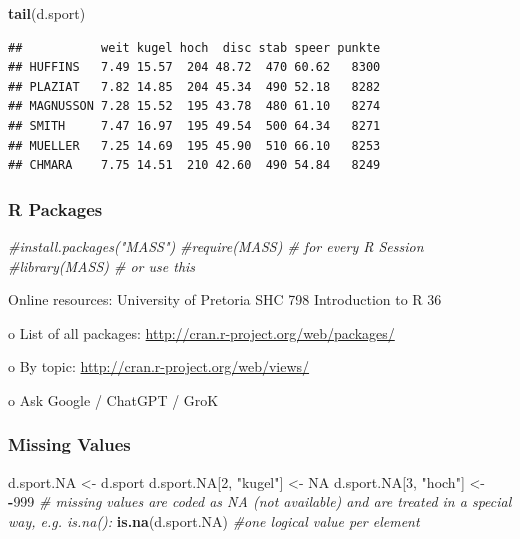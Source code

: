 \documentclass[
]{article}
\newenvironment{Shaded}{\begin{snugshade}}{\end{snugshade}}
\newcommand{\CommentTok}[1]{\textcolor[rgb]{0.56,0.35,0.01}{\textit{#1}}}
\newcommand{\ConstantTok}[1]{\textcolor[rgb]{0.56,0.35,0.01}{#1}}
\newcommand{\DecValTok}[1]{\textcolor[rgb]{0.00,0.00,0.81}{#1}}
\newcommand{\FunctionTok}[1]{\textcolor[rgb]{0.13,0.29,0.53}{\textbf{#1}}}
\newcommand{\NormalTok}[1]{#1}
\newcommand{\OtherTok}[1]{\textcolor[rgb]{0.56,0.35,0.01}{#1}}
\newcommand{\SpecialCharTok}[1]{\textcolor[rgb]{0.81,0.36,0.00}{\textbf{#1}}}
\newcommand{\StringTok}[1]{\textcolor[rgb]{0.31,0.60,0.02}{#1}}
\begin{document}
\begin{Shaded}
\begin{Highlighting}[]
\FunctionTok{tail}\NormalTok{(d.sport)}
\end{Highlighting}
\end{Shaded}

\begin{verbatim}
##           weit kugel hoch  disc stab speer punkte
## HUFFINS   7.49 15.57  204 48.72  470 60.62   8300
## PLAZIAT   7.82 14.85  204 45.34  490 52.18   8282
## MAGNUSSON 7.28 15.52  195 43.78  480 61.10   8274
## SMITH     7.47 16.97  195 49.54  500 64.34   8271
## MUELLER   7.25 14.69  195 45.90  510 66.10   8253
## CHMARA    7.75 14.51  210 42.60  490 54.84   8249
\end{verbatim}

\subsubsection{R Packages}\label{r-packages}

\begin{Shaded}
\begin{Highlighting}[]
\CommentTok{\#install.packages("MASS")}
\CommentTok{\#require(MASS) \# for every R Session}
\CommentTok{\#library(MASS) \# or use this}
\end{Highlighting}
\end{Shaded}

Online resources: University of Pretoria \textbar{} SHC 798 \textbar{}
Introduction to R 36

o List of all packages: \url{http://cran.r-project.org/web/packages/}

o By topic: \url{http://cran.r-project.org/web/views/}

o Ask Google / ChatGPT / GroK

\subsubsection{Missing Values}\label{missing-values}

\begin{Shaded}
\begin{Highlighting}[]
\NormalTok{d.sport.NA }\OtherTok{\textless{}{-}}\NormalTok{ d.sport}
\NormalTok{d.sport.NA[}\DecValTok{2}\NormalTok{, }\StringTok{"kugel"}\NormalTok{] }\OtherTok{\textless{}{-}} \ConstantTok{NA} 
\NormalTok{d.sport.NA[}\DecValTok{3}\NormalTok{, }\StringTok{"hoch"}\NormalTok{] }\OtherTok{\textless{}{-}} \SpecialCharTok{{-}}\DecValTok{999}
\CommentTok{\# missing values are coded as NA (not available) and are treated in a special way, e.g. is.na():}
\FunctionTok{is.na}\NormalTok{(d.sport.NA) }\CommentTok{\#one logical value per element}
\end{Highlighting}
\end{Shaded}
\end{document}

